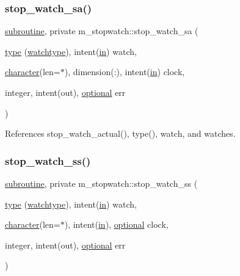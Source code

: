 \subsubsection{\texorpdfstring{stop\+\_\+watch\+\_\+sa()}{stop\_watch\_sa()}}
{\footnotesize\ttfamily \hyperlink{M__stopwatch_83_8txt_acfbcff50169d691ff02d4a123ed70482}{subroutine}, private m\+\_\+stopwatch\+::stop\+\_\+watch\+\_\+sa (\begin{DoxyParamCaption}\item[{\hyperlink{stop__watch_83_8txt_a70f0ead91c32e25323c03265aa302c1c}{type} (\hyperlink{structm__stopwatch_1_1watchtype}{watchtype}), intent(\hyperlink{M__journal_83_8txt_afce72651d1eed785a2132bee863b2f38}{in})}]{watch,  }\item[{\hyperlink{option__stopwatch_83_8txt_abd4b21fbbd175834027b5224bfe97e66}{character}(len=$\ast$), dimension(\+:), intent(\hyperlink{M__journal_83_8txt_afce72651d1eed785a2132bee863b2f38}{in})}]{clock,  }\item[{integer, intent(out), \hyperlink{option__stopwatch_83_8txt_aa4ece75e7acf58a4843f70fe18c3ade5}{optional}}]{err }\end{DoxyParamCaption})\hspace{0.3cm}{\ttfamily [private]}}



References stop\+\_\+watch\+\_\+actual(), type(), watch, and watches.

\mbox{\label{namespacem__stopwatch_ad2412b50e118e372b548e3b9317f9ed4}} 
\subsubsection{\texorpdfstring{stop\+\_\+watch\+\_\+ss()}{stop\_watch\_ss()}}
{\footnotesize\ttfamily \hyperlink{M__stopwatch_83_8txt_acfbcff50169d691ff02d4a123ed70482}{subroutine}, private m\+\_\+stopwatch\+::stop\+\_\+watch\+\_\+ss (\begin{DoxyParamCaption}\item[{\hyperlink{stop__watch_83_8txt_a70f0ead91c32e25323c03265aa302c1c}{type} (\hyperlink{structm__stopwatch_1_1watchtype}{watchtype}), intent(\hyperlink{M__journal_83_8txt_afce72651d1eed785a2132bee863b2f38}{in})}]{watch,  }\item[{\hyperlink{option__stopwatch_83_8txt_abd4b21fbbd175834027b5224bfe97e66}{character}(len=$\ast$), intent(\hyperlink{M__journal_83_8txt_afce72651d1eed785a2132bee863b2f38}{in}), \hyperlink{option__stopwatch_83_8txt_aa4ece75e7acf58a4843f70fe18c3ade5}{optional}}]{clock,  }\item[{integer, intent(out), \hyperlink{option__stopwatch_83_8txt_aa4ece75e7acf58a4843f70fe18c3ade5}{optional}}]{err }\end{DoxyParamCaption})\hspace{0.3cm}{\ttfamily [private]}}



